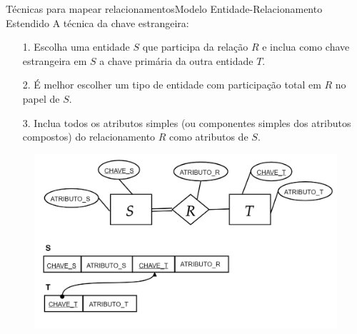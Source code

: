 \documentclass[t]{beamer}
\begin{document}
\begin{ftst}{Técnicas para mapear relacionamentos}{Modelo Entidade-Relacionamento Estendido}
A técnica da chave estrangeira:
\footnotesize
\begin{itemize}
    \item[1.]  Escolha uma entidade $S$ que participa da relação $R$ e inclua como chave estrangeira em $S$ a chave primária da outra entidade $T$. 
    \item[2.] É melhor escolher um tipo de entidade com participação total em $R$ no papel de $S$.
    \item[3.] Inclua todos os atributos simples (ou componentes simples dos atributos compostos) do relacionamento $R$ como atributos de $S$.
\end{itemize}
\begin{figure}
    \includegraphics[scale=0.15]{Figuras/03_06.png}
\end{figure}
\end{ftst}

\end{document}
